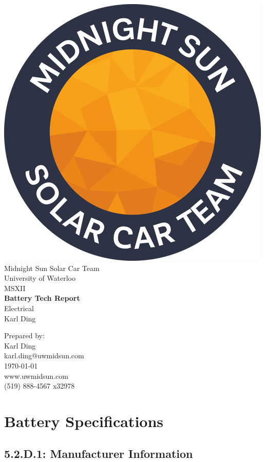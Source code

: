 \documentclass[10pt]{article}
\makeatletter
\newcommand\theteamname{Midnight Sun Solar Car Team} %
\newcommand\theuniversityname{University of Waterloo} %
\newcommand\theteamwebsite{www.uwmidsun.com} %
\newcommand\theteamphone{(519) 888-4567 x32978} %
\newcommand\thetitle{Battery Tech Report} %
\newcommand\thesubtitle{Electrical} %
\newcommand\theauthor{Karl Ding} %
\newcommand\theauthorcontact{karl.ding@uwmidsun.com} %
\newcommand\thedate{\today} %
\makeatother
\begin{document}
\begin{titlepage}
\large
\vspace*{2cm}
\centering
\includegraphics[width=.25\textwidth]{./figures/midnightSunLogoCircle.png} \\
\vspace{1.5cm}
{\LARGE \theteamname} \\
\theuniversityname \\
\vspace{2.2cm}
{\LARGE MSXII} \\
\vspace{0.4cm}
{\huge\bfseries \thetitle} \\
\vspace{0.2cm}
{\LARGE \thesubtitle} \\
\vspace{2.2cm}
\ifdefined \theauthor
\par Prepared by: \\
\theauthor \\
\theauthorcontact \\
\fi
\thedate \\
\vfill
\theteamwebsite \\
\theteamphone
\end{titlepage}

\tableofcontents

\newpage

\section{Battery Specifications}

\subsection{5.2.D.1: Manufacturer Information}
\end{document}
